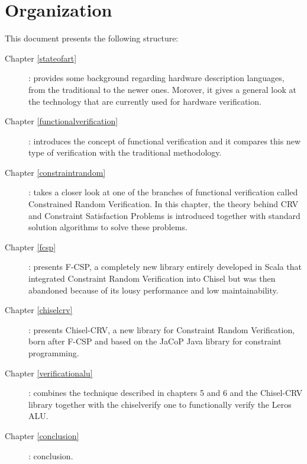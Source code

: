 \section{Organization}
This document presents the following structure:
\begin{description}
\item[Chapter \ref{stateofart}] : provides some background regarding hardware
  description languages, from the traditional to the newer ones. Morover, it
  gives a general look at the technology that are currently used for hardware
  verification.
\item[Chapter \ref{functionalverification}] : introduces the concept of
  functional verification and it compares this new type of verification with the
  traditional methodology.
\item[Chapter \ref{constraintrandom}] : takes a closer look at one of the
  branches of functional verification called Constrained Random Verification. In
  this chapter, the theory behind CRV and Constraint Satisfaction Problems is
  introduced together with standard solution algorithms to solve these problems.
\item[Chapter \ref{fcsp}] : presents F-CSP, a completely new library entirely
  developed in Scala that integrated Constraint Random Verification into Chisel
  but was then abandoned because of its lousy performance and low
  maintainability.
\item[Chapter \ref{chiselcrv}] : presents Chisel-CRV, a new library for
  Constraint Random Verification, born after F-CSP and based on the JaCoP Java
  library for constraint programming.
\item[Chapter \ref{verificationalu}] : combines the technique described in
  chapters 5 and 6 and the Chisel-CRV library together with the chiselverify one
  to functionally verify the Leros ALU.
\item[Chapter \ref{conclusion}] : conclusion.
\end{description}

